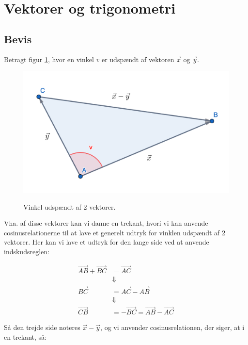 \documentclass{article}
\makeatletter
\newenvironment{proofw}{\par
  \pushQED{\qed}%
  \normalfont \topsep6\p@\@plus6\p@\relax
  \trivlist
  \item[]\ignorespaces
}{%
  \popQED\endtrivlist\@endpefalse
}
\makeatother
\begin{document}
\tableofcontents

\section{Vektorer og trigonometri}

\subsection{Bevis}

\begin{proofw}
    
Betragt figur \ref{fig:trekant_vektor}, hvor en vinkel $v$ er udspændt af vektoren $\vec{x}$ og $\vec{y}$.

\begin{figure}[h]
    \centering
    \includegraphics[scale=0.3]{./skitser/trekant_vektor_skitse.png}
    \label{fig:trekant_vektor}
    \caption{Vinkel udspændt af 2 vektorer.}
\end{figure}

Vha. af disse vektorer kan vi danne en trekant, hvori vi kan anvende cosinusrelationerne
til at lave et generelt udtryk for vinklen udspændt af 2 vektorer.
Her kan vi lave et udtryk for den lange side ved at anvende indskudsreglen:

\begin{align*}
    \vec{AB}+\vec{BC}&=\vec{AC}
    \\
    &\Downarrow
    \\
    \vec{BC}&=\vec{AC}-\vec{AB}
    \\
    &\Downarrow
    \\
    \vec{CB}&=-\vec{BC}=\vec{AB}-\vec{AC}
\end{align*}

Så den trejde side noteres $\vec{x}-\vec{y}$, og vi anvender cosinusrelationen, der siger, at i en trekant, så:


\end{proofw}
\end{document}

